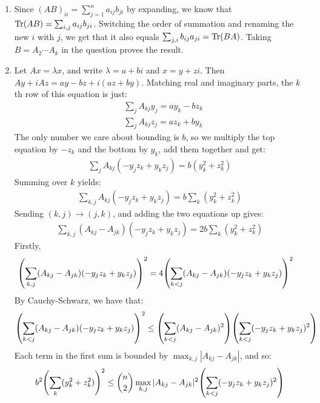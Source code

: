 \documentclass[12pt]{article}
\theoremstyle{definitionstyle}
\newcommand{\1}{\mathds 1}
\begin{document}
\begin{enumerate}
        \item Since $(AB)_{ii} = \sum_{j=1}^n a_{ij}b_{ji}$ by expanding, we know that $\Tr(AB) = \sum_{i,j} a_{ij}b_{ji}$. Switching the order of summation and renaming the new $i$ with $j$, we get that it also equals $\sum_{j,i} b_{ij} a_{ji} = \Tr(BA)$. Taking $B = A_2 \cdots A_k$ in the question proves the result.

        \item Let $Ax = \lambda x$, and write $\lambda = a + bi$ and $x = y + zi$. Then $Ay + iAz = ay - bz + i(az+by)$. Matching real and imaginary parts, the $k$th row of this equation is just:
        \begin{align*}
            &\sum_j A_{kj}y_j = ay_k - bz_k \\
            &\sum_j A_{kj}z_j = az_k + by_k
        \end{align*}
        The only number we care about bounding is $b$, so we multiply the top equation by $-z_k$ and the bottom by $y_k$, add them together and get:
        \begin{align*}
            \sum_j A_{kj}(-y_jz_k + y_kz_j) = b(y_k^2+z_k^2)
        \end{align*}
        Summing over $k$ yields:
        \begin{align*}
            \sum_{k,j} A_{kj}(-y_jz_k + y_kz_j) = b\sum_k (y_k^2+z_k^2)
        \end{align*}
        Sending $(k,j) \to (j,k)$, and adding the two equations up gives:
        \begin{align*}
            \sum_{k,j} (A_{kj} - A_{jk})(-y_jz_k + y_kz_j) = 2b\sum_k (y_k^2+z_k^2)
        \end{align*}
        Firstly, 
        \begin{align*}
            \qty(\sum_{k,j} (A_{kj}-A_{jk})(-y_jz_k+y_kz_j))^2 &= 4 \qty(\sum_{k<j} (A_{kj}-A_{jk})(-y_jz_k + y_kz_j))^2
        \end{align*}
        By Cauchy-Schwarz, we have that:
        \begin{align*}
            \qty(\sum_{k<j} (A_{kj}-A_{jk})(-y_jz_k + y_kz_j))^2 \leq \qty(\sum_{k<j} (A_{kj}-A_{jk})^2)\qty(\sum_{k<j} (-y_jz_k + y_kz_j)^2)
        \end{align*}
        Each term in the first sum is bounded by $\max_{k,j} |A_{kj}-A_{jk}|$, and so:
        \begin{align*}
            b^2 \qty(\sum_k (y_k^2+z_k^2))^2 \leq {n \choose 2}\max_{k,j} |A_{kj}-A_{jk}|^2\qty(\sum_{k<j} (-y_jz_k + y_kz_j)^2)
        \end{align*}

\end{enumerate}
\end{document}

